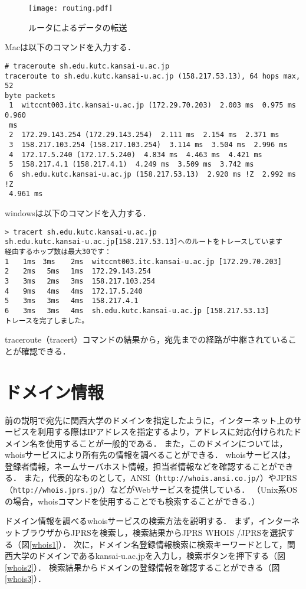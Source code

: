 \begin{figure}[tbp]
 \begin{center}
  \texttt{[image: routing.pdf]}
 \end{center}
 \caption{ルータによるデータの転送}
 \label{router}
\end{figure}
\newpage
Macは以下のコマンドを入力する．
\begin{screen}
\begin{verbatim}
# traceroute sh.edu.kutc.kansai-u.ac.jp
traceroute to sh.edu.kutc.kansai-u.ac.jp (158.217.53.13), 64 hops max, 52 
byte packets
 1  witccnt003.itc.kansai-u.ac.jp (172.29.70.203)  2.003 ms  0.975 ms  0.960 
 ms
 2  172.29.143.254 (172.29.143.254)  2.111 ms  2.154 ms  2.371 ms
 3  158.217.103.254 (158.217.103.254)  3.114 ms  3.504 ms  2.996 ms
 4  172.17.5.240 (172.17.5.240)  4.834 ms  4.463 ms  4.421 ms
 5  158.217.4.1 (158.217.4.1)  4.249 ms  3.509 ms  3.742 ms
 6  sh.edu.kutc.kansai-u.ac.jp (158.217.53.13)  2.920 ms !Z  2.992 ms !Z  
 4.961 ms
 \end{verbatim}
\end{screen}

windowsは以下のコマンドを入力する．
\begin{screen}
\begin{Verbatim}[frame=single]
> tracert sh.edu.kutc.kansai-u.ac.jp
sh.edu.kutc.kansai-u.ac.jp[158.217.53.13]へのルートをトレースしています
経由するホップ数は最大30です：
1　　1ms　3ms　  2ms  witccnt003.itc.kansai-u.ac.jp [172.29.70.203]
2　　2ms 　5ms 　1ms  172.29.143.254
3　　3ms 　2ms 　3ms  158.217.103.254
4　　9ms 　4ms 　4ms  172.17.5.240
5　　3ms 　3ms 　4ms  158.217.4.1
6　　3ms 　3ms 　4ms  sh.edu.kutc.kansai-u.ac.jp [158.217.53.13]
トレースを完了しました。
\end{Verbatim}
\end{screen}
traceroute（tracert）コマンドの結果から，宛先までの経路が中継されていることが確認できる．

\section{ドメイン情報}
前の説明で宛先に関西大学のドメインを指定したように，インターネット上のサービスを利用する際はIPアドレスを指定するより，アドレスに対応付けられたドメイン名を使用することが一般的である．
また，このドメインについては，whoisサービスにより所有先の情報を調べることができる．
whoisサービスは，登録者情報，ネームサーバホスト情報，担当者情報などを確認することができる．
また，代表的なものとして，ANSI（\verb|http://whois.ansi.co.jp/|）やJPRS（\verb|http://whois.jprs.jp/|）などがWebサービスを提供している．
（Unix系OSの場合，whoisコマンドを使用することでも検索することができる．）\par
ドメイン情報を調べるwhoisサービスの検索方法を説明する．
まず，インターネットブラウザからJPRSを検索し，検索結果からJPRS WHOIS /JPRSを選択する（図\ref{whois1}）．
次に，ドメイン名登録情報検索に検索キーワードとして，関西大学のドメインであるkansai-u.ac.jpを入力し，検索ボタンを押下する（図\ref{whois2}）．
検索結果からドメインの登録情報を確認することができる（図\ref{whois3}）．

